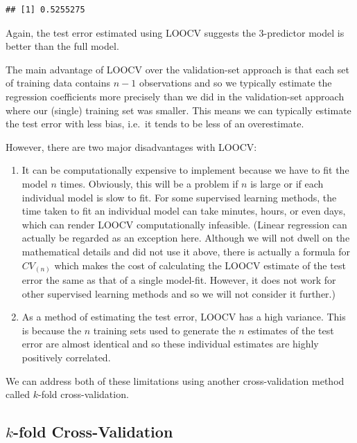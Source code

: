 \documentclass[
]{article}
\begin{document}
\begin{verbatim}
## [1] 0.5255275
\end{verbatim}

Again, the test error estimated using LOOCV suggests the 3-predictor
model is better than the full model.

The main advantage of LOOCV over the validation-set approach is that
each set of training data contains \(n-1\) observations and so we
typically estimate the regression coefficients more precisely than we
did in the validation-set approach where our (single) training set was
smaller. This means we can typically estimate the test error with less
bias, i.e.~it tends to be less of an overestimate.

However, there are two major disadvantages with LOOCV:

\begin{enumerate}
\def\labelenumi{\arabic{enumi}.}
\item
  It can be computationally expensive to implement because we have to
  fit the model \(n\) times. Obviously, this will be a problem if \(n\)
  is large or if each individual model is slow to fit. For some
  supervised learning methods, the time taken to fit an individual model
  can take minutes, hours, or even days, which can render LOOCV
  computationally infeasible. (Linear regression can actually be
  regarded as an exception here. Although we will not dwell on the
  mathematical details and did not use it above, there is actually a
  formula for \(CV_{(n)}\) which makes the cost of calculating the LOOCV
  estimate of the test error the same as that of a single model-fit.
  However, it does not work for other supervised learning methods and so
  we will not consider it further.)
\item
  As a method of estimating the test error, LOOCV has a high variance.
  This is because the \(n\) training sets used to generate the \(n\)
  estimates of the test error are almost identical and so these
  individual estimates are highly positively correlated.
\end{enumerate}

We can address both of these limitations using another cross-validation
method called \(k\)-fold cross-validation.

\hypertarget{subsec:kfoldcrossvalidation}{%
\subsection{\texorpdfstring{\(k\)-fold
Cross-Validation}{k-fold Cross-Validation}}\label{subsec:kfoldcrossvalidation}}
\end{document}
